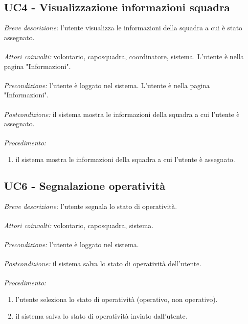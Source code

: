 \subsection{UC4 - Visualizzazione informazioni squadra}
\textit{Breve descrizione:} l'utente visualizza le informazioni della squadra a cui è stato assegnato.
\\
\\
\textit{Attori coinvolti:} volontario, caposquadra, coordinatore, sistema. L'utente è nella pagina "Informazioni".
\\
\\
\textit{Precondizione:} l'utente è loggato nel sistema. L'utente è nella pagina "Informazioni".
\\
\\
\textit{Postcondizione:} il sistema mostra le informazioni della squadra a cui l'utente è assegnato.
\\
\\
\textit{Procedimento:}
\begin{enumerate}
	\item il sistema mostra le informazioni della squadra a cui l'utente è assegnato.
\end{enumerate}

\subsection{UC6 - Segnalazione operatività}
\textit{Breve descrizione:} l'utente segnala lo stato di operatività. 
\\
\\
\textit{Attori coinvolti:} volontario, caposquadra, sistema.
\\
\\
\textit{Precondizione:} l'utente è loggato nel sistema.
\\
\\
\textit{Postcondizione:} il sistema salva lo stato di operatività dell'utente.
\\
\\
\textit{Procedimento:}
\begin{enumerate}
	\item l'utente seleziona lo stato di operatività (operativo, non operativo).
	\item il sistema salva lo stato di operatività inviato dall'utente.
\end{enumerate}



